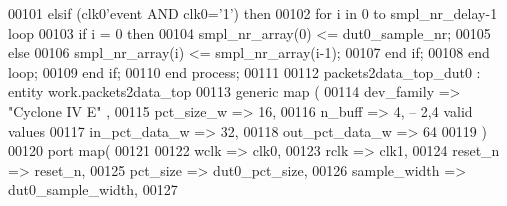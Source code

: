 \begin{DoxyCode}
00101       \textcolor{keywordflow}{elsif} \textcolor{vhdlchar}{(}\textcolor{vhdlchar}{clk0}\textcolor{vhdlchar}{'}\textcolor{vhdlkeyword}{event} \textcolor{keywordflow}{AND} \textcolor{vhdlchar}{clk0}\textcolor{vhdlchar}{=}\textcolor{vhdlchar}{'}\textcolor{vhdllogic}{}\textcolor{vhdllogic}{1}\textcolor{vhdlchar}{'}\textcolor{vhdlchar}{)} \textcolor{keywordflow}{then} 
00102          \textcolor{keywordflow}{for} \textcolor{vhdlchar}{i} \textcolor{keywordflow}{in} \textcolor{vhdllogic}{}\textcolor{vhdllogic}{0} \textcolor{keywordflow}{to} \textcolor{vhdlchar}{smpl_nr_delay}\textcolor{vhdlchar}{-}\textcolor{vhdllogic}{}\textcolor{vhdllogic}{1} \textcolor{keywordflow}{loop}
00103             \textcolor{keywordflow}{if} \textcolor{vhdlchar}{i} \textcolor{vhdlchar}{=} \textcolor{vhdllogic}{}\textcolor{vhdllogic}{0} \textcolor{keywordflow}{then} 
00104                \textcolor{vhdlchar}{smpl_nr_array}\textcolor{vhdlchar}{(}\textcolor{vhdllogic}{}\textcolor{vhdllogic}{0}\textcolor{vhdlchar}{)} \textcolor{vhdlchar}{<=} \textcolor{vhdlchar}{dut0_sample_nr};
00105             \textcolor{keywordflow}{else} 
00106                \textcolor{vhdlchar}{smpl_nr_array}\textcolor{vhdlchar}{(}\textcolor{vhdlchar}{i}\textcolor{vhdlchar}{)} \textcolor{vhdlchar}{<=} \textcolor{vhdlchar}{smpl_nr_array}\textcolor{vhdlchar}{(}\textcolor{vhdlchar}{i}\textcolor{vhdlchar}{-}\textcolor{vhdllogic}{}\textcolor{vhdllogic}{1}\textcolor{vhdlchar}{)};
00107             \textcolor{keywordflow}{end} \textcolor{keywordflow}{if};
00108          \textcolor{keywordflow}{end} \textcolor{keywordflow}{loop};
00109       \textcolor{keywordflow}{end} \textcolor{keywordflow}{if};
00110    \textcolor{keywordflow}{end} \textcolor{keywordflow}{process};
00111   
00112   packets2data\_top\_dut0 : \textcolor{keywordflow}{entity} work.packets2data_top
00113    \textcolor{keywordflow}{generic} \textcolor{keywordflow}{map} (
00114       dev_family        => \textcolor{keyword}{"Cyclone IV E"}  ,
00115       pct_size_w        =>  \textcolor{vhdllogic}{16},
00116       n_buff            =>  \textcolor{vhdllogic}{4},\textcolor{keyword}{ -- 2,4 valid values}
00117       in_pct_data_w     =>  \textcolor{vhdllogic}{32},
00118       out_pct_data_w    =>  \textcolor{vhdllogic}{64}
00119    \textcolor{vhdlchar}{)}
00120    \textcolor{keywordflow}{port} \textcolor{keywordflow}{map}(
00121 
00122       wclk              => clk0,
00123       rclk              => clk1, 
00124       reset_n           => reset_n,
00125       pct_size          => dut0_pct_size,
00126       sample_width      => dut0_sample_width,
00127       

\end{DoxyCode}
